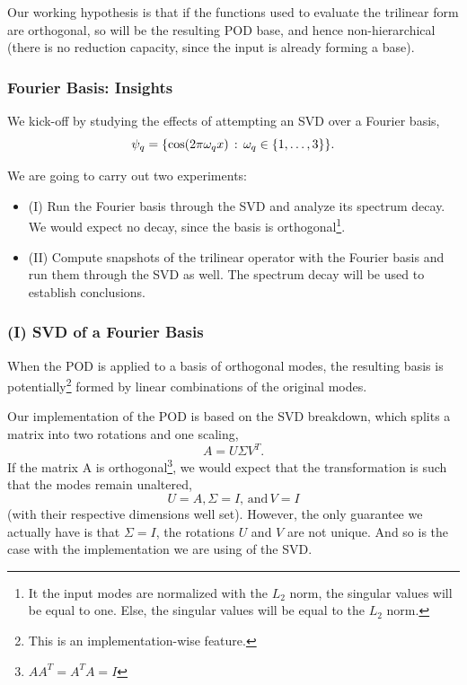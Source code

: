 \documentclass[../../thesis.tex]{subfiles}
\begin{document}
Our working hypothesis is that if the functions used to evaluate the 
trilinear form are orthogonal, so will be the resulting POD base,
and hence non-hierarchical 
(there is no reduction capacity, since the input is already forming a base).

\subsubsection{Fourier Basis: Insights}
We kick-off by studying the effects of attempting an SVD over a Fourier basis, 
\begin{equation}
    \psi_q = \qty{\cos(2 \pi \omega_q x) \, : \, \omega_q \in \qty{1, \ldots, 3}}.
\end{equation}

We are going to carry out two experiments:
\begin{itemize}
    \item (I) Run the Fourier basis through the SVD and analyze its spectrum decay. 
    We would expect no decay, since the basis is orthogonal\footnote
    {
        It the input modes are normalized with the $L_2$ norm, 
        the singular values will be equal to one.
        Else, the singular values will be equal to the $L_2$ norm.
    }.
    \item (II) Compute snapshots of the trilinear operator with the Fourier basis
    and run them through the SVD as well.
    The spectrum decay will be used to establish conclusions. 
\end{itemize}

\subsubsection{(I) SVD of a Fourier Basis}
When the POD is applied to a basis of orthogonal modes, 
the resulting basis is potentially\footnote{
    This is an implementation-wise feature.
} formed 
by linear combinations of the original modes.

Our implementation of the POD is based on the SVD breakdown, which splits a matrix into 
two rotations and one scaling,
\begin{equation}
    A = U \Sigma V^T.
\end{equation}
If the matrix A is orthogonal\footnote
{
    $AA^T = A^T A = I$
},
we would expect that the transformation is such that the modes
remain unaltered,
\begin{equation*}
    U=A, \Sigma = I, \, \text{and} \, V=I
\end{equation*}
(with their respective dimensions well set).
However, the only guarantee we actually have is that $\Sigma = I$,
the rotations $U$ and $V$ are not unique.
And so is the case with the implementation we are using of the SVD.
\end{document}
